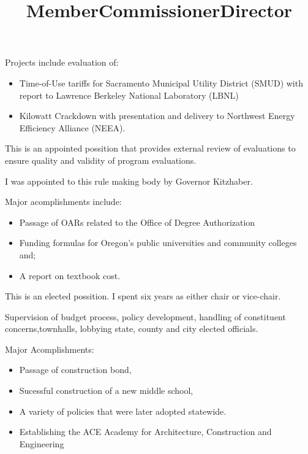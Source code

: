 \documentclass[margin]{res}
\begin{document}
\begin{resume}
\begin{position}
Projects include evaluation of:
\begin{itemize}
\item Time-of-Use tariffs for Sacramento Municipal Utility District (SMUD) with report to Lawrence Berkeley National Laboratory (LBNL)
\item Kilowatt Crackdown with presentation  and delivery to Northwest Energy Efficiency Alliance (NEEA).
\end{itemize}

\end{position}

\title{\textbf{Member}}
\begin{position}
This is an appointed possition that provides external review of evaluations to ensure quality and validity of program evaluations.


\end{position}


\title{\textbf{Commissioner}}
\begin{position}
I was appointed to this rule making body by Governor Kitzhaber.

Major acomplishments include:
\begin{itemize}
\item Passage of OARs related to the Office of Degree Authorization
\item Funding formulas for Oregon's public universities and community colleges and;
\item A report on textbook cost.
\end{itemize}

\end{position}

\title{\textbf{Director}}
\begin{position}
This is an elected possition.  I spent six years as either chair or vice-chair.

Supervision of budget process, policy development, handling of constituent concerns,townhalls, lobbying state, county and city elected officials.

Major Acomplishments: 

\begin{itemize}
\item Passage of construction bond, 
\item Sucessful construction of a new middle school, 
\item A variety of policies that were later adopted statewide.
\item Establishing the ACE Academy for Architecture, Construction and Engineering
\end{itemize}


\end{position}
\end{resume}
\end{document}
